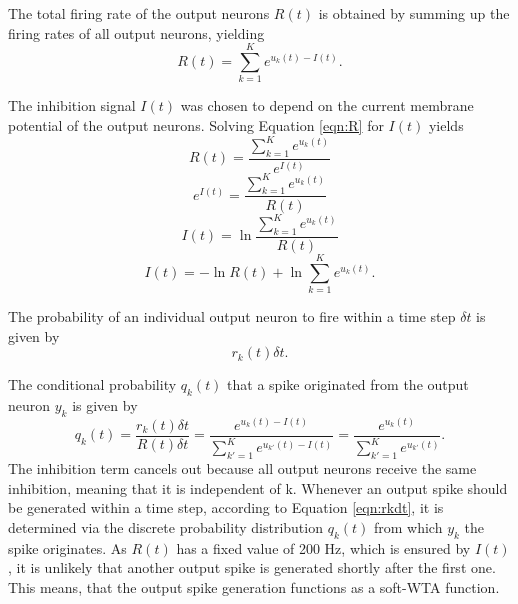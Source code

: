 The total firing rate of the output neurons $R(t)$	 is obtained by summing up the firing rates of all output neurons, yielding 
\begin{equation}
\label{eqn:R}
R(t) = \sum_{k=1}^K e^{u_k(t) - I(t)}.
\end{equation}

The inhibition signal $I(t)$ was chosen to depend on the current membrane potential of the output neurons. 
Solving Equation \ref{eqn:R} for $I(t)$ yields
\begin{equation}
\label{}
R(t) = \frac{ \sum_{k=1}^K e^{u_k(t)}}{e^{I(t)}}
\end{equation}
\begin{equation}
\label{}
e^{I(t)} = \frac{\sum_{k=1}^K e^{u_k(t)}}{R(t)}
\end{equation}
\begin{equation}
\label{}
I(t) = \ln{ \frac{ \sum_{k=1}^K e^{u_k(t)}}{R(t)}}
\end{equation}
\begin{equation}
\label{eqn:I(t)}
I(t) =  - \ln{R(t)} + \ln{  \sum_{k=1}^K e^{u_k(t)}}.
\end{equation}

The probability of an individual output neuron to fire within a time step $\delta t$ is given by
\begin{equation}
\label{eqn:rkdt}
r_k(t) \delta t.
\end{equation}

The conditional probability $q_k(t)$ that a spike originated from the output neuron $y_k$ is given by
\begin{equation}
\label{eqn:qk}
q_k(t) = \frac{r_k(t) \delta t}{R(t) \delta t} = \frac{e^{u_k(t) - I(t)}}{\sum_{k'=1}^K e^{u_{k'}(t) - I(t)}} = \frac{e^{u_k(t)}}{\sum_{k'=1}^K e^{u_{k'}(t)}}.
\end{equation}
The inhibition term cancels out because all output neurons receive the same inhibition, meaning that it is independent of k. Whenever an output spike should be generated within a time step, according to Equation \ref{eqn:rkdt}, it is determined via the discrete probability distribution $q_k(t)$ from which $y_k$ the spike originates. As $R(t)$ has a fixed value of 200 Hz, which is ensured by $I(t)$, it is unlikely that another output spike is generated shortly after the first one. This means, that the output spike generation functions as a soft-WTA function.
 
